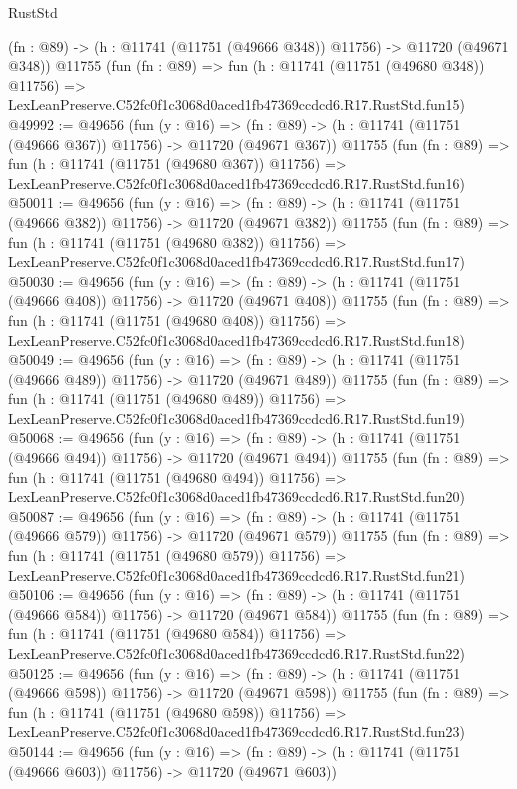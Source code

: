 \begin{lexlean}{RustStd}
\begin{coremodule}
    (fn : @89) -> (h : @11741 (@11751 (@49666 @348)) @11756) -> @11720 (@49671 @348))
    @11755
    (fun (fn : @89) =>
    fun (h : @11741 (@11751 (@49680 @348)) @11756) =>
    LexLeanPreserve.C52fc0f1c3068d0aced1fb47369ccdcd6.R17.RustStd.fun15)
@49992 := @49656
    (fun (y : @16) =>
    (fn : @89) -> (h : @11741 (@11751 (@49666 @367)) @11756) -> @11720 (@49671 @367))
    @11755
    (fun (fn : @89) =>
    fun (h : @11741 (@11751 (@49680 @367)) @11756) =>
    LexLeanPreserve.C52fc0f1c3068d0aced1fb47369ccdcd6.R17.RustStd.fun16)
@50011 := @49656
    (fun (y : @16) =>
    (fn : @89) -> (h : @11741 (@11751 (@49666 @382)) @11756) -> @11720 (@49671 @382))
    @11755
    (fun (fn : @89) =>
    fun (h : @11741 (@11751 (@49680 @382)) @11756) =>
    LexLeanPreserve.C52fc0f1c3068d0aced1fb47369ccdcd6.R17.RustStd.fun17)
@50030 := @49656
    (fun (y : @16) =>
    (fn : @89) -> (h : @11741 (@11751 (@49666 @408)) @11756) -> @11720 (@49671 @408))
    @11755
    (fun (fn : @89) =>
    fun (h : @11741 (@11751 (@49680 @408)) @11756) =>
    LexLeanPreserve.C52fc0f1c3068d0aced1fb47369ccdcd6.R17.RustStd.fun18)
@50049 := @49656
    (fun (y : @16) =>
    (fn : @89) -> (h : @11741 (@11751 (@49666 @489)) @11756) -> @11720 (@49671 @489))
    @11755
    (fun (fn : @89) =>
    fun (h : @11741 (@11751 (@49680 @489)) @11756) =>
    LexLeanPreserve.C52fc0f1c3068d0aced1fb47369ccdcd6.R17.RustStd.fun19)
@50068 := @49656
    (fun (y : @16) =>
    (fn : @89) -> (h : @11741 (@11751 (@49666 @494)) @11756) -> @11720 (@49671 @494))
    @11755
    (fun (fn : @89) =>
    fun (h : @11741 (@11751 (@49680 @494)) @11756) =>
    LexLeanPreserve.C52fc0f1c3068d0aced1fb47369ccdcd6.R17.RustStd.fun20)
@50087 := @49656
    (fun (y : @16) =>
    (fn : @89) -> (h : @11741 (@11751 (@49666 @579)) @11756) -> @11720 (@49671 @579))
    @11755
    (fun (fn : @89) =>
    fun (h : @11741 (@11751 (@49680 @579)) @11756) =>
    LexLeanPreserve.C52fc0f1c3068d0aced1fb47369ccdcd6.R17.RustStd.fun21)
@50106 := @49656
    (fun (y : @16) =>
    (fn : @89) -> (h : @11741 (@11751 (@49666 @584)) @11756) -> @11720 (@49671 @584))
    @11755
    (fun (fn : @89) =>
    fun (h : @11741 (@11751 (@49680 @584)) @11756) =>
    LexLeanPreserve.C52fc0f1c3068d0aced1fb47369ccdcd6.R17.RustStd.fun22)
@50125 := @49656
    (fun (y : @16) =>
    (fn : @89) -> (h : @11741 (@11751 (@49666 @598)) @11756) -> @11720 (@49671 @598))
    @11755
    (fun (fn : @89) =>
    fun (h : @11741 (@11751 (@49680 @598)) @11756) =>
    LexLeanPreserve.C52fc0f1c3068d0aced1fb47369ccdcd6.R17.RustStd.fun23)
@50144 := @49656
    (fun (y : @16) =>
    (fn : @89) -> (h : @11741 (@11751 (@49666 @603)) @11756) -> @11720 (@49671 @603))

\end{coremodule}
\end{lexlean}
